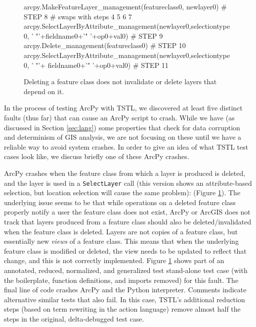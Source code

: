 \begin{figure}
{\begin{code}
arcpy.MakeFeatureLayer\_management(featureclass0, newlayer0)               \textcolor{black!60}{\# STEP 8}
\textcolor{black!60}{\#  swaps with steps 4 5 6 7}
arcpy.SelectLayerByAttribute\_management(newlayer0,selectiontype0,
   ' "'+fieldname0+'" '+op0+val0)                                         \textcolor{black!60}{\# STEP 9}
arcpy.Delete\_management(featureclass0)                                    \textcolor{black!60}{\# STEP 10}
arcpy.SelectLayerByAttribute\_management(newlayer0,selectiontype0,
   ' "'+ fieldname0+'" '+op0+val0)                                        \textcolor{black!60}{\# STEP 11}
\end{code}
}
\caption{Deleting a feature class does not invalidate or delete layers that depend on it.}
\label{fault1}
\end{figure}

In the process of testing ArcPy with TSTL, we discovered at least five
distinct faults
(thus far) that can cause an ArcPy script to crash.  While we have (as
discussed in Section \ref{sec:lang}) some properties that check for
data corruption and determinism of GIS analysis, we are not focusing
on these until we have a reliable way to avoid system crashes.   In
order to give an idea of what TSTL test cases look like, we discuss
briefly one of these ArcPy crashes.

ArcPy crashes when the feature class from which a layer is produced is
deleted, and the layer is used in a {\tt SelectLayer} call (this
version shows an attribute-based selection, but location selection
will cause the same problem): (Figure \ref{fault1}).  The underlying issue seems to be that
while operations on a deleted feature class properly notify a user the
feature class does not exist, ArcPy or ArcGIS does not track that
layers produced from a feature class should also be deleted/invalidated
when the feature class is deleted.  Layers are not copies
of a feature class, but essentially new \emph{views} of a feature class.
This means that when the underlying feature class is modified or
deleted, the view needs to be updated to reflect that change, and this
is not correctly implemented.  Figure \ref{fault1} shows part of an
annotated, reduced, normalized, and generalized test stand-alone test
case (with the boilerplate, function definitions, and imports
removed) for this fault.  The final line of code crashes ArcPy and the
Python interpreter.  Comments indicate alternative similar tests that
also fail.  In this case, TSTL's additional reduction steps (based on
term rewriting in the action language) remove almost half the steps in
the original, delta-debugged test case.

